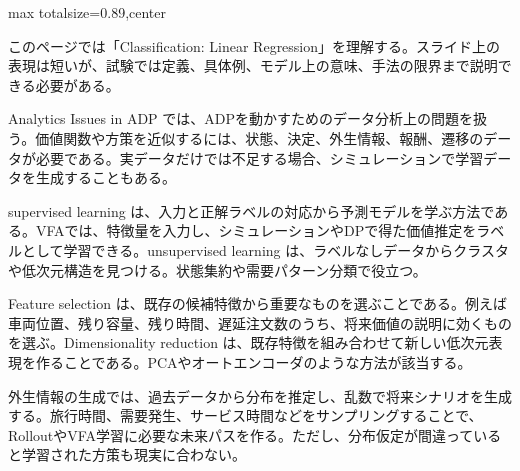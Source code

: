 \begin{minipage}[t]{0.58\textwidth}
\begin{adjustbox}{max totalsize={\textwidth}{0.89\textheight},center}
\begin{minipage}{\textwidth}\scriptsize
{}このページでは「Classification: Linear Regression」を理解する。スライド上の表現は短いが、試験では定義、具体例、モデル上の意味、手法の限界まで説明できる必要がある。\par
Analytics Issues in ADP では、ADPを動かすためのデータ分析上の問題を扱う。価値関数や方策を近似するには、状態、決定、外生情報、報酬、遷移のデータが必要である。実データだけでは不足する場合、シミュレーションで学習データを生成することもある。\par
supervised learning は、入力と正解ラベルの対応から予測モデルを学ぶ方法である。VFAでは、特徴量を入力し、シミュレーションやDPで得た価値推定をラベルとして学習できる。unsupervised learning は、ラベルなしデータからクラスタや低次元構造を見つける。状態集約や需要パターン分類で役立つ。\par
Feature selection は、既存の候補特徴から重要なものを選ぶことである。例えば車両位置、残り容量、残り時間、遅延注文数のうち、将来価値の説明に効くものを選ぶ。Dimensionality reduction は、既存特徴を組み合わせて新しい低次元表現を作ることである。PCAやオートエンコーダのような方法が該当する。\par
外生情報の生成では、過去データから分布を推定し、乱数で将来シナリオを生成する。旅行時間、需要発生、サービス時間などをサンプリングすることで、RolloutやVFA学習に必要な未来パスを作る。ただし、分布仮定が間違っていると学習された方策も現実に合わない。\par

\end{minipage}
\end{adjustbox}
\end{minipage}
